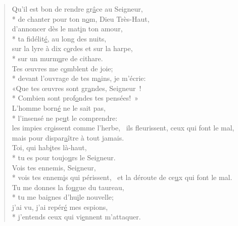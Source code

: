 
\begin{verse}
Qu’il est bon de rendre gr\underline{â}ce au Seigneur, \\*
de chanter pour ton n\underline{o}m, Dieu Très-Haut, \\
d’annoncer dès le mat\underline{i}n ton amour, \\*
ta fidélit\underline{é}, au long des nuits, \\
sur la lyre à dix c\underline{o}rdes et sur la harpe, \\*
sur un murm\underline{u}re de cithare. \\

Tes œuvres me c\underline{o}mblent de joie; \\*
devant l’ouvrage de tes m\underline{a}ins, je m’écrie: \\
«Que tes œuvres sont gr\underline{a}ndes, Seigneur ! \\*
Combien sont prof\underline{o}ndes tes pensées! » \\

L’homme born\underline{é} ne le sait pas, \\*
l’insensé ne pe\underline{u}t le comprendre: \\
les impies cr\underline{o}issent comme l’herbe,~\psalmstar
ils fleurissent, ceux qui font le mal, \\
mais pour dispar\underline{a}ître à tout jamais. \\

Toi, qui hab\underline{i}tes là-haut, \\*
tu es pour toujo\underline{u}rs le Seigneur. \\
Vois tes ennemis, Seigneur, \\*
vois tes ennem\underline{i}s qui périssent,~\psalmstar
et la déroute de ce\underline{u}x qui font le mal. \\

Tu me donnes la fo\underline{u}gue du taureau, \\*
tu me baignes d’hu\underline{i}le nouvelle; \\
j’ai vu, j’ai repér\underline{é} mes espions, \\*
j’entends ceux qui vi\underline{e}nnent m’attaquer. \\


\end{verse}
